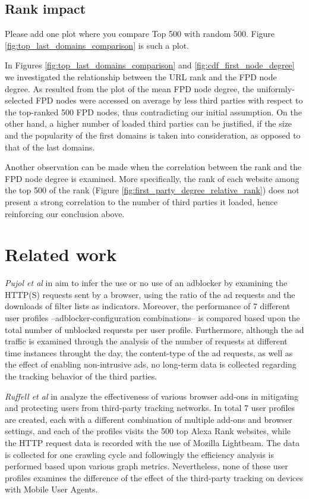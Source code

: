 \documentclass{sig-alternate}
\begin{document}
\subsection{Rank impact}
{\color{red}Please add one plot where you compare Top 500 with random 500. Figure \ref{fig:top_last_domains_comparison} is such a plot.}
{\color{blue}
In Figures \ref{fig:top_last_domains_comparison} and \ref{fig:cdf_first_node_degree} we investigated the relationship between the URL rank and the FPD node degree. As resulted from the plot of the mean FPD node degree, the uniformly-selected FPD nodes were accessed on average by less third parties with respect to the top-ranked 500 FPD nodes, thus contradicting our initial assumption. On the other hand, a higher number of loaded third parties can be justified, if the size and the popularity of the first domains is taken into consideration, as opposed to that of the last domains.

Another observation can be made when the correlation between the rank and the FPD node degree is examined. More specifically, the rank of each website among the top 500 of the rank (Figure \ref{fig:first_party_degree_relative_rank}) does not present a strong correlation to the number of third parties it loaded, hence reinforcing our conclusion above.
}

\section{Related work}

\textit{Pujol et al} in \cite{pujol} aim to infer the use or no use of an adblocker by examining the HTTP(S) requests sent by a browser, using the ratio of the ad requests and the downloads of filter lists as indicators. Moreover, the performance of 7 different user profiles --adblocker-configuration combinations-- is compared based upon the total number of unblocked requests per user profile. Furthermore, although the ad traffic is examined through the analysis of the number of requests at different time instances throught the day, the content-type of the ad requests, as well as the effect of enabling non-intrusive ads, no long-term data is collected regarding the tracking behavior of the third parties.

\textit{Ruffell et al} in \cite{ruffel2015} analyze the effectiveness of various browser add-ons in mitigating and protecting users from third-party tracking networks. In total 7 user profiles are created, each with a different combination of multiple add-ons and browser settings, and each of the profiles visits the 500 top Alexa Rank websites, while the HTTP request data is recorded with the use of Mozilla Lightbeam. The data is collected for one crawling cycle and followingly the efficiency analysis is performed based upon various graph metrics. Nevertheless, none of these user profiles examines the difference of the effect of the third-party tracking on devices with Mobile User Agents.
\end{document}
